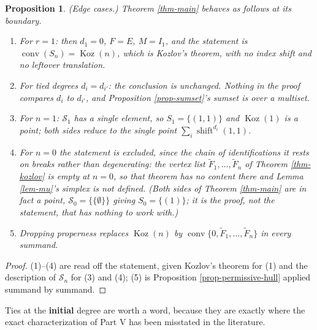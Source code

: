 \documentclass[11pt, a4paper, abstract=yes]{scrartcl}
\theoremstyle{definition}
\theoremstyle{remark}
\theoremstyle{plain}
\newtheorem{proposition}[definition]{Proposition}
\newcommand{\Koz}{\operatorname{Koz}}
\newcommand{\shift}{\operatorname{shift}}
\newcommand{\leanpartial}{\tikz[baseline=-0.6ex]{\fill[leanfull] (0,-0.6ex) arc (-90:90:0.6ex) -- cycle;\draw[leanfull,line width=0.5pt] (0,0) circle (0.6ex);}}
\newcommand{\leanmark}[1]{\leavevmode{\reversemarginpar\marginnote{\raggedleft#1}}}
\newcommand{\conv}{\operatorname{conv}}
\let\autocite\cite
\begin{document}
\begin{proposition}
\leanmark{\leanpartial}(\emph{Edge cases.}) Theorem \ref{thm-main} behaves as follows at its boundary.
\begin{enumerate}
\item For \(r=1\): then \(d_1=0\), \(F=E\), \(M=I_1\), and the statement is
\(\conv(S_n)=\Koz(n)\), which is Kozlov's theorem, with no index shift and no leftover
translation.
\item For tied degrees \(d_i=d_{i'}\): the conclusion is unchanged. Nothing in the proof compares
\(d_i\) to \(d_{i'}\), and Proposition \ref{prop-sumset}'s sumset is over a multiset.
\item For \(n=1\): \(\mathcal S_1\) has a single element, so \(S_1=\lbrace(1,1)\rbrace\) and
\(\Koz(1)\) is a point; both sides reduce to the single point \(\sum_i\shift^{d_i}(1,1)\).
\item For \(n=0\) the statement is excluded, since the chain of identifications it rests on breaks
rather than degenerating: the vertex list \(\tilde F_1,\dots,\tilde F_n\) of
Theorem \ref{thm-kozlov} is empty at \(n=0\), so that theorem has no content there and
Lemma \ref{lem-mu}'s simplex is not defined. (Both sides of Theorem \ref{thm-main} are in fact a
point, \(\mathcal S_0=\lbrace\lbrace\emptyset\rbrace\rbrace\) giving \(S_0=\lbrace(1)\rbrace\); it
is the proof, not the statement, that has nothing to work with.)
\item Dropping properness replaces \(\Koz(n)\) by
\(\conv\lbrace0,\tilde F_1,\dots,\tilde F_n\rbrace\) in every summand.
\end{enumerate}
\label{prop:edge-cases}
\label{prop-edge-cases}
\end{proposition}

\begin{proof}
(1)--(4) are read off the statement, given Kozlov's theorem for (1) and the description of
\(\mathcal S_n\) for (3) and (4); (5) is Proposition \ref{prop-permissive-hull} applied summand by summand.
\end{proof}

Ties at the \textbf{initial} degree are worth a word, because they are exactly where the exact
characterization of Part V \autocite{SnellmanArticle5} has been misstated in the literature.
\end{document}
